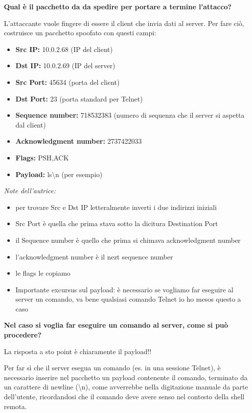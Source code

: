 \documentclass{report}
\begin{document}
\begin{center}
    \textbf{Qual è il pacchetto da da spedire per portare a termine l'attacco?}
\end{center}
\noindent L'attaccante vuole fingere di essere il client che invia dati al server. Per fare ciò, costruisce un pacchetto spoofato con questi campi:
\begin{itemize}
    \item \textbf{Src IP:} 10.0.2.68 (IP del client)
    \item \textbf{Dst IP:} 10.0.2.69 (IP del server)
    \item \textbf{Src Port:} 45634 (porta del client)
    \item \textbf{Dst Port:} 23 (porta standard per Telnet)
    \item \textbf{Sequence number:} 718532383 (numero di sequenza che il server si aspetta dal client)
    \item \textbf{Acknowledgment number:} 2737422033
    \item \textbf{Flags:} PSH,ACK
    \item \textbf{Payload:} ls\textbackslash n (per esempio)
\end{itemize}

\noindent \textit{Note dell'autrice:} 
\begin{itemize}
    \item per trovare Src e Dst IP letteralmente inverti i due indirizzi iniziali
    \item Src Port è quella che prima stava sotto la dicitura Destination Port
    \item il Sequence number è quello che prima si chimava acknowledgment number 
    \item l'acknowledgment number è il nezt sequence number
    \item le flags le copiamo
    \item Importante excursus sul payload: è necessario se vogliamo far eseguire al server un comando, va bene qualsiasi comando Telnet io ho mesos questo a caso
\end{itemize}

\begin{center}
    \textbf{Nel caso si voglia far eseguire un comando al server, come si può procedere?}
\end{center}
\noindent La risposta a sto point è chiaramente il payload!!

\noindent Per far sì che il server esegua un comando (es. in una sessione Telnet), è necessario
inserire nel pacchetto un payload contenente il comando, terminato da un carattere di newline (\textbackslash n), come avverrebbe nella digitazione manuale da parte dell'utente,
ricordandosi che il comando deve avere senso nel contesto della shell remota.
\end{document}
